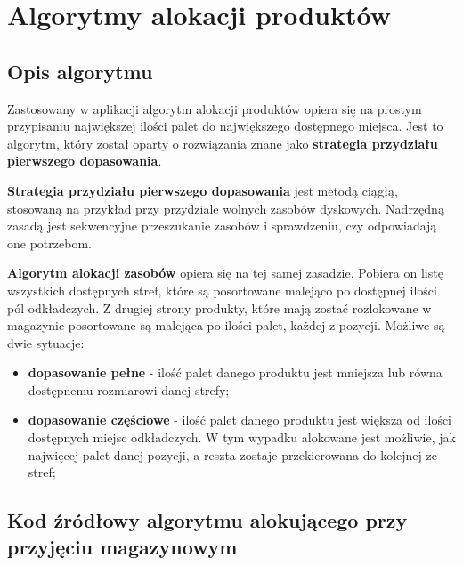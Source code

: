 \chapter{Algorytmy alokacji produktów}
\label{ca:allocationAlgorithms}

	\section{Opis algorytmu}
		Zastosowany w aplikacji algorytm alokacji produktów opiera się na prostym 
		przypisaniu największej ilości palet do największego dostępnego miejsca. 
		Jest to algorytm, który został oparty o rozwiązania znane jako 
		\textbf{strategia przydziału pierwszego dopasowania}.
		
		\textbf{Strategia przydziału pierwszego dopasowania} jest metodą ciągłą,
		stosowaną na przykład przy przydziale wolnych zasobów dyskowych. Nadrzędną zasadą
		jest sekwencyjne przeszukanie zasobów i sprawdzeniu, czy odpowiadają one 
		potrzebom.
		
		\textbf{Algorytm alokacji zasobów} opiera się na tej samej zasadzie. Pobiera
		on listę wszystkich dostępnych stref, które są posortowane malejąco po dostępnej
		ilości pól odkładczych. Z drugiej strony produkty, które mają zostać
		rozlokowane w magazynie posortowane są malejąca po ilości palet, każdej z pozycji.
		Możliwe są dwie sytuacje:
		\begin{itemize}
			\item \textbf{dopasowanie pełne} - ilość palet danego produktu jest mniejsza lub
			równa dostępnemu rozmiarowi danej strefy;
			\item \textbf{dopasowanie częściowe} - ilość palet danego produktu jest większa od ilości
			dostępnych miejsc odkładczych. W tym wypadku alokowane jest możliwie, jak najwięcej palet
			danej pozycji, a reszta zostaje przekierowana do kolejnej ze stref;
		\end{itemize}

	\section{Kod źródłowy algorytmu alokującego przy przyjęciu magazynowym}
